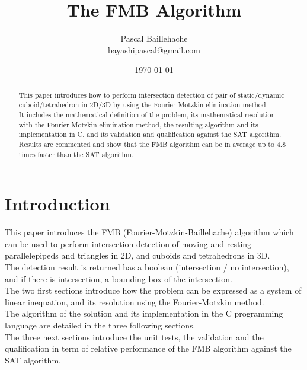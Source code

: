 \documentclass[12pt, a4paper]{article}
\begin{document}
\title{The FMB Algorithm}
\author{Pascal Baillehache\\bayashipascal@gmail.com}
\date{\today}
\maketitle
\thispagestyle{empty}

\begin{abstract}
This paper introduces how to perform intersection detection of pair of static/dynamic cuboid/tetrahedron in 2D/3D by using the Fourier-Motzkin elimination method.\\
It includes the mathematical definition of the problem, its mathematical resolution with the Fourier-Motzkin elimination method, the resulting algorithm and its implementation in C, and its validation and qualification against the SAT algorithm. Results are commented and show that the FMB algorithm can be in average up to 4.8 times faster than the SAT algorithm.
\end{abstract}

\newpage
\tableofcontents

\section*{Introduction}

This paper introduces the FMB (Fourier-Motzkin-Baillehache) algorithm which can be used to perform intersection detection of moving and resting parallelepipeds and triangles in 2D, and cuboids and tetrahedrons in 3D.\\

The detection result is returned has a boolean (intersection / no intersection), and if there is intersection, a bounding box of the intersection.\\

The two first sections introduce how the problem can be expressed as a system of linear inequation, and its resolution using the Fourier-Motzkin method.\\

The algorithm of the solution and its implementation in the C programming language are detailed in the three following sections.\\

The three next sections introduce the unit tests, the validation and the qualification in term of relative performance of the FMB algorithm against the SAT algorithm.\\
\end{document}
